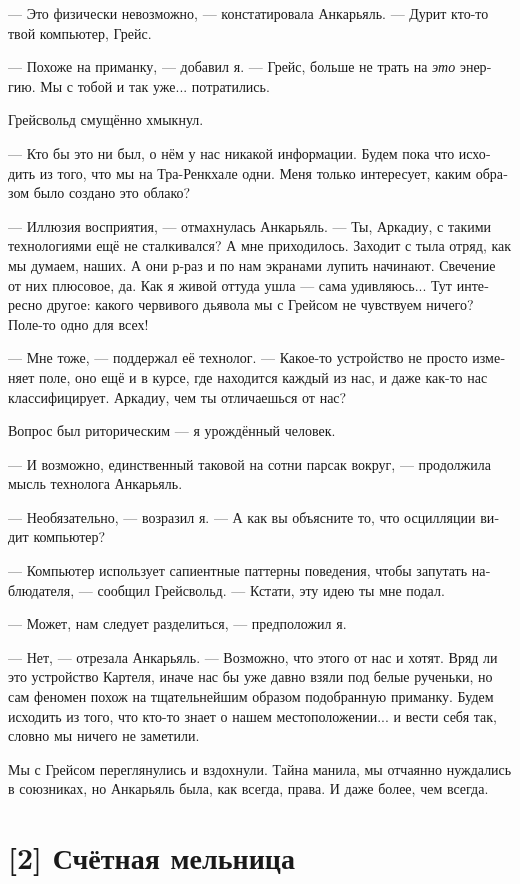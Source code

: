 \documentclass[a4paper,12pt,fleqn]{book}\usepackage{cooltooltips}\usepackage{polyglossia}\setdefaultlanguage[babelshorthands=true]{russian}\setotherlanguage{english}\defaultfontfeatures{Ligatures=TeX,Mapping=tex-text} \usepackage{xcolor}\definecolor{lightgray}{HTML}{bbbbbb}\color{lightgray}\newcommand{\ml}[3]{\textenglish{\textcolor{black}{#3}}}
\begin{document}
{--- Это физически невозможно, --- констатировала Анкарьяль.
--- Дурит кто-то твой компьютер, Грейс.

--- Похоже на приманку, --- добавил я.
--- Грейс, больше не трать на \emph{это} энергию.
Мы с тобой и так уже... потратились.

Грейсвольд смущённо хмыкнул.

--- Кто бы это ни был, о нём у нас никакой информации.
Будем пока что исходить из того, что мы на Тра-Ренкхале одни.
Меня только интересует, каким образом было создано это облако?

--- Иллюзия восприятия, --- отмахнулась Анкарьяль.
--- Ты, Аркадиу, с такими технологиями ещё не сталкивался?
А мне приходилось.
Заходит с тыла отряд, как мы думаем, наших.
А они р-раз и по нам экранами лупить начинают.
Свечение от них плюсовое, да.
Как я живой оттуда ушла --- сама удивляюсь...
Тут интересно другое: какого червивого дьявола мы с Грейсом не чувствуем ничего?
Поле-то одно для всех!

--- Мне тоже, --- поддержал её технолог.
--- Какое-то устройство не просто изменяет поле, оно ещё и в курсе, где находится каждый из нас, и даже как-то нас классифицирует.
Аркадиу, чем ты отличаешься от нас?

Вопрос был риторическим --- я урождённый человек.

--- И возможно, единственный таковой на сотни парсак вокруг, --- продолжила мысль технолога Анкарьяль.

--- Необязательно, --- возразил я.
--- А как вы объясните то, что осцилляции видит компьютер?

--- Компьютер использует сапиентные паттерны поведения, чтобы запутать наблюдателя, --- сообщил Грейсвольд.
--- Кстати, эту идею ты мне подал.

--- Может, нам следует разделиться, --- предположил я.

--- Нет, --- отрезала Анкарьяль.
--- Возможно, что этого от нас и хотят.
Вряд ли это устройство Картеля, иначе нас бы уже давно взяли под белые рученьки, но сам феномен похож на тщательнейшим образом подобранную приманку.
Будем исходить из того, что кто-то знает о нашем местоположении... и вести себя так, словно мы ничего не заметили.

Мы с Грейсом переглянулись и вздохнули.
Тайна манила, мы отчаянно нуждались в союзниках, но Анкарьяль была, как всегда, права.
И даже более, чем всегда.

\section{[2] Счётная мельница}

}
\end{document}
